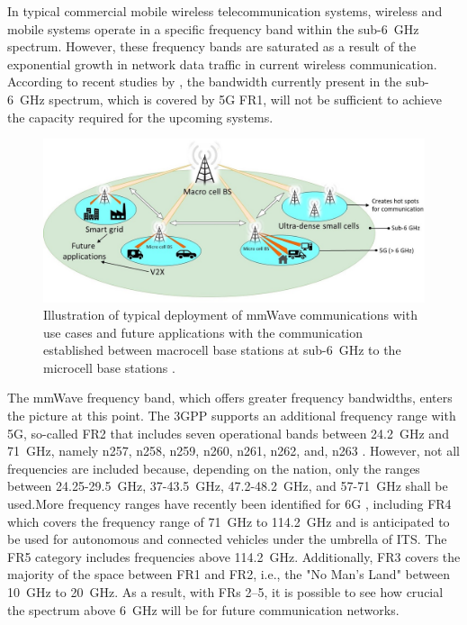 In typical commercial mobile wireless telecommunication systems, wireless and mobile systems operate in a specific frequency band within the sub-\SI{6}{\giga\hertz} spectrum. However, these frequency bands are saturated as a result of the exponential growth in network data traffic in current wireless communication. According to recent studies by \cite{diakhate2019propagation}, the bandwidth currently present in the sub-\SI{6}{\giga\hertz} spectrum, which is covered by 5G \ac{FR1}, will not be sufficient to achieve the capacity required for the upcoming systems.
\begin{figure}[H]
	\centering
	\includegraphics[width=1.0\linewidth]{images/Section 2 Images/5Gmm}
	\caption{Illustration of typical deployment of mmWave communications with use cases and future applications with the communication established between macrocell base stations at sub-\SI{6}{\giga\hertz} to the microcell base stations \cite{mmWavefig1, Sakaguchi2017WhereWA}.}
	\label{fig:5gmm}
\end{figure}
The \ac{mmWave} frequency band, which offers greater frequency bandwidths, enters the picture at this point. The \ac{3GPP} supports an additional frequency range with 5G, so-called \ac{FR2} that includes seven operational bands between \SI{24.2}{\giga\hertz} and \SI{71}{\giga\hertz}, namely n\num{257}, n\num{258}, n\num{259}, n\num{260}, n\num{261}, n\num{262}, and, n\num{263} \cite{3GPP17}. However, not all frequencies are included because, depending on the nation, only the ranges between \num{24.25}-\SI{29.5}{\giga\hertz}, \num{37}-\SI{43.5}{\giga\hertz}, \num{47.2}-\SI{48.2}{\giga\hertz}, and \num{57}-\SI{71}{\giga\hertz} shall be used.More frequency ranges have recently been identified for 6G \cite{3GPP17}, including \ac{FR4} which covers the frequency range of \SI{71}{\giga\hertz} to \SI{114.2}{\giga\hertz} and is anticipated to be used for autonomous and connected vehicles under the umbrella of \ac{ITS}. The \ac{FR5} category includes frequencies above \SI{114.2}{\giga\hertz}. Additionally, \ac{FR3} covers the majority of the space between \ac{FR1} and \ac{FR2}, i.e., the "No Man's Land" \cite{Qualcomm} between \SI{10}{\giga\hertz} to \SI{20}{\giga\hertz}. As a result, with FRs \num{2}–\num{5}, it is possible to see how crucial the spectrum above \SI{6}{\giga\hertz} will be for future communication networks.

